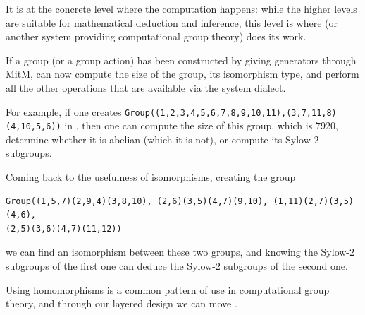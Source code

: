It is at the concrete level where the computation happens: while the higher levels
are suitable for mathematical deduction and inference, this level is where \GAP
(or another system providing computational group theory) does its work.

If a group (or a group action) has been constructed by giving generators
through MitM, \GAP can now compute the size of the group, its isomorphism type,
and perform all the other operations that are available via the \GAP system
dialect.

For example, if one creates \lstinline|Group((1,2,3,4,5,6,7,8,9,10,11),(3,7,11,8)(4,10,5,6))|
in \GAP, then one can compute the size of this group, which is $7920$, determine
whether it is abelian (which it is not), or compute its Sylow-$2$ subgroups.

Coming back to the usefulness of isomorphisms, creating the group
\begin{lstlisting}
Group((1,5,7)(2,9,4)(3,8,10), (2,6)(3,5)(4,7)(9,10), (1,11)(2,7)(3,5)(4,6),
(2,5)(3,6)(4,7)(11,12))
\end{lstlisting}
we can find an isomorphism between these two groups, and knowing the Sylow-$2$
subgroups of the first one can deduce the Sylow-$2$ subgroups of the second one.

Using homomorphisms is a common pattern of use in computational group theory,
and through our layered design we can move  .






